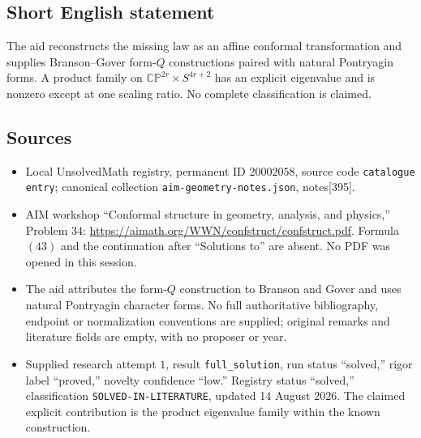 \documentclass[11pt]{article}
\begin{document}
\subsection{Short English statement}
The aid reconstructs the missing law as an affine conformal transformation and supplies Branson--Gover form-\(Q\) constructions paired with natural Pontryagin forms. A product family on \(\mathbb{CP}^{2r}\times S^{4r+2}\) has an explicit eigenvalue and is nonzero except at one scaling ratio. No complete classification is claimed.
\subsection{Sources}
\begin{itemize}
\item Local UnsolvedMath registry, permanent ID \(20002058\), source code \texttt{catalogue entry}; canonical collection \texttt{aim-geometry-notes.json}, notes[395].
\item AIM workshop ``Conformal structure in geometry, analysis, and physics,'' Problem \(34\): \url{https://aimath.org/WWN/confstruct/confstruct.pdf}. Formula \((43)\) and the continuation after ``Solutions to'' are absent. No PDF was opened in this session.
\item The aid attributes the form-\(Q\) construction to Branson and Gover and uses natural Pontryagin character forms. No full authoritative bibliography, endpoint or normalization conventions are supplied; original remarks and literature fields are empty, with no proposer or year.
\item Supplied research attempt \(1\), result \texttt{full\_solution}, run status ``solved,'' rigor label ``proved,'' novelty confidence ``low.'' Registry status ``solved,'' classification \texttt{SOLVED-IN-LITERATURE}, updated 14 August 2026. The claimed explicit contribution is the product eigenvalue family within the known construction.
\end{itemize}
\end{document}
